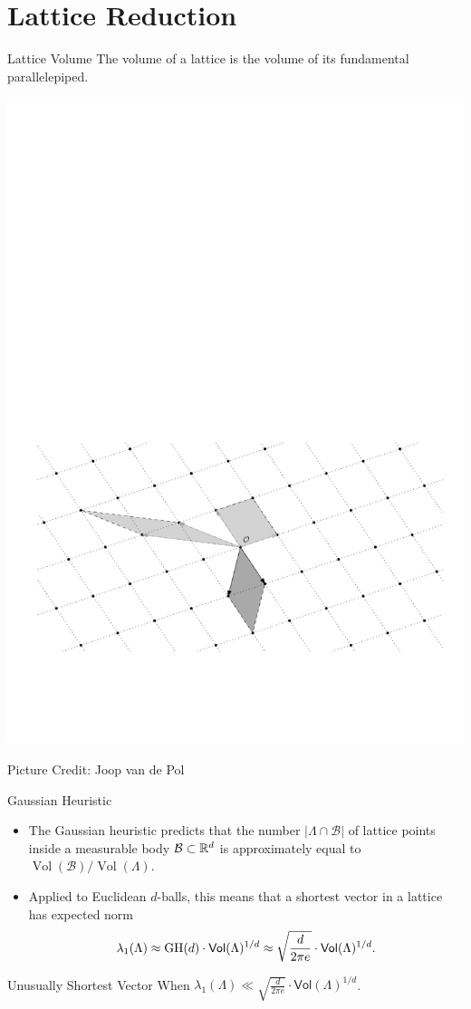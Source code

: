 \documentclass[table,10pt,aspectratio=169]{beamer}
\DeclareMathOperator{\Vol}{Vol}
\begin{document}
\section{Lattice Reduction}
\label{sec:org7a9b47c}
\begin{frame}[label={sec:org2907f77}]{Lattice Volume}
The volume of a lattice is the volume of its fundamental parallelepiped.

\begin{center}
\includegraphics[width=0.8\linewidth]{./assets/lattice-volume.pdf}
\end{center}

\tiny Picture Credit: Joop van de Pol
\end{frame}

\begin{frame}[label={sec:org1b7c4af}]{Gaussian Heuristic}
\begin{itemize}
\item The Gaussian heuristic predicts that the number \(|\Lambda \cap \mathcal{B}|\) of lattice points inside a measurable body \(\mathcal{B} \subset \mathbb{R}^d\) is approximately equal to \(\Vol(\mathcal{B}) / \Vol(\Lambda)\).
\item Applied to Euclidean \(d\)-balls, this means that a shortest vector in a lattice has expected norm \[\lambda_1(\Lambda) \approx \textnormal{GH}(d) \cdot \mathsf{Vol}(\Lambda)^{1/d} \approx \sqrt{\frac{d}{2\pi e}} \cdot \mathsf{Vol}(\Lambda)^{1/d} .\]
\end{itemize}

\begin{block}{Unusually Shortest Vector}
When \(\lambda_1(\Lambda) \ll \sqrt{\frac{d}{2 \pi e}} \cdot \mathsf{Vol}(\Lambda)^{1/d}\).
\end{block}
\end{frame}
\end{document}
